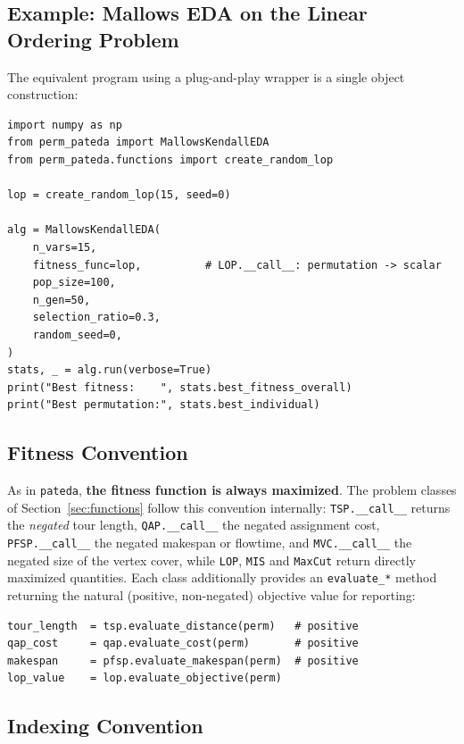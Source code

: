 \documentclass[a4paper,11pt]{article}
\begin{document}
\subsection{Example: Mallows EDA on the Linear Ordering Problem}

The equivalent program using a plug-and-play wrapper is a single object
construction:

\begin{lstlisting}
import numpy as np
from perm_pateda import MallowsKendallEDA
from perm_pateda.functions import create_random_lop

lop = create_random_lop(15, seed=0)

alg = MallowsKendallEDA(
    n_vars=15,
    fitness_func=lop,          # LOP.__call__: permutation -> scalar
    pop_size=100,
    n_gen=50,
    selection_ratio=0.3,
    random_seed=0,
)
stats, _ = alg.run(verbose=True)
print("Best fitness:    ", stats.best_fitness_overall)
print("Best permutation:", stats.best_individual)
\end{lstlisting}

\subsection{Fitness Convention}

As in \texttt{pateda}, \textbf{the fitness function is always maximized}.  The
problem classes of Section~\ref{sec:functions} follow this convention
internally: \texttt{TSP.\_\_call\_\_} returns the \emph{negated} tour length,
\texttt{QAP.\_\_call\_\_} the negated assignment cost, \texttt{PFSP.\_\_call\_\_}
the negated makespan or flowtime, and \texttt{MVC.\_\_call\_\_} the negated size
of the vertex cover, while \texttt{LOP}, \texttt{MIS} and \texttt{MaxCut} return
directly maximized quantities.  Each class additionally provides an
\texttt{evaluate\_*} method returning the natural (positive, non-negated)
objective value for reporting:

\begin{lstlisting}
tour_length  = tsp.evaluate_distance(perm)   # positive
qap_cost     = qap.evaluate_cost(perm)       # positive
makespan     = pfsp.evaluate_makespan(perm)  # positive
lop_value    = lop.evaluate_objective(perm)
\end{lstlisting}

\subsection{Indexing Convention}
\end{document}
